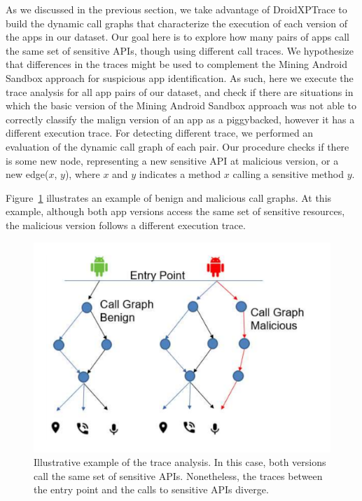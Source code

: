 As we discussed in the previous section, we take advantage of DroidXPTrace to build the dynamic call graphs that characterize the execution of each version of the apps in our dataset. Our goal
here is to explore how many pairs of apps call the same set of sensitive APIs, though using different call
traces. We hypothesize that differences in the traces might be used to complement the Mining Android Sandbox approach for suspicious app identification. As such, here we execute the trace analysis for all app pairs of our dataset, and check if there are situations in which the basic version of the Mining Android Sandbox approach was not able to correctly classify the malign version of an app as a piggybacked, however it has a different execution trace. For detecting different trace, we performed an evaluation of the dynamic call graph of each pair. Our procedure checks if there is some new node, representing a new sensitive API at malicious version, or a new edge($x$, $y$), where $x$ and $y$ indicates a method $x$ calling a sensitive method $y$.

Figure~\ref{fig:callGraph} illustrates an example of benign and malicious call graphs.
At this example, although both app versions access the same set of sensitive resources, the
malicious version follows a different execution trace. 


\begin{figure}[ht]
\centering
\includegraphics[scale=0.30]{images/maliciousCallGraph.pdf}
\caption{Illustrative example of the trace analysis. In this case, both versions call the same set of sensitive APIs. Nonetheless,
the traces between the entry point and the calls to sensitive APIs diverge.}
 \label{fig:callGraph}
\end{figure}


